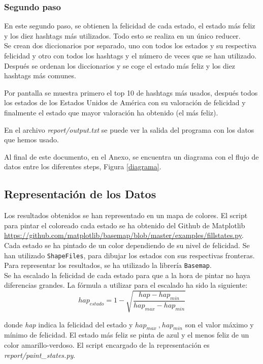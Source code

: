 \documentclass[12pt,a4paper]{article}
\begin{document}
\begin{itemize}
\subsubsection{Segundo paso}

En este segundo paso, se obtienen  la felicidad de cada estado, el estado más feliz y los diez hashtags más utilizados. Todo esto se realiza en un único reducer.\\

Se crean dos diccionarios por separado, uno con todos los estados y su respectiva felicidad y otro con todos los hashtags y el número de veces que se han utilizado. Después se ordenan los diccionarios y se coge el estado más feliz y los diez hashtags más comunes.

Por pantalla se muestra primero el top 10 de hashtags más usados, después todos los estados de los Estados Unidos de América con su valoración de felicidad y finalmente el estado que mayor valoración ha obtenido (el más feliz).

En el archivo \textit{report/output.txt} se puede ver la salida del programa con los datos que hemos usado.
\end{itemize}

Al final de este documento, en el Anexo, se encuentra un diagrama con el flujo de datos entre los diferentes steps, Figura \ref{diagrama}.

\subsection{Representación de los Datos}
Los resultados obtenidos se han representado en un mapa de colores. El script para pintar el coloreado cada estado se ha obtenido del Github de Matplotlib 	\url{https://github.com/matplotlib/basemap/blob/master/examples/fillstates.py}.\\
Cada estado se ha pintado de un color dependiendo de su nivel de felicidad. Se han utilizado \texttt{ShapeFiles}, para dibujar los estados con sus respectivas fronteras. Para representar los resultados, se ha utilizado la librería \texttt{Basemap}.\\

Se ha escalado la felicidad de cada estado para que a la hora de pintar no haya diferencias grandes. La fórmula a utilizar para el escalado ha sido la siguiente:
$$hap_{estado}=1-\displaystyle \sqrt{\dfrac{hap-hap_{min}}{hap_{max}-hap_{min}}}$$

donde \textit{hap} indica la felicidad del estado y $hap_{max}\ \text{,}\ hap_{min}$ son el valor máximo y mínimo de felicidad.
El estado más feliz se pinta de azul y el menos feliz de un color amarillo-verdoso. El script encargado de la representación es \textit{report/paint\_states.py}. 
\end{document}
